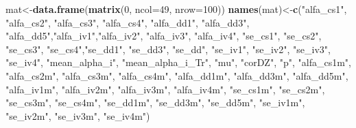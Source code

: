 \documentclass[]{article}
\newenvironment{Shaded}{\begin{snugshade}}{\end{snugshade}}
\newcommand{\KeywordTok}[1]{\textcolor[rgb]{0.13,0.29,0.53}{\textbf{{#1}}}}
\newcommand{\DataTypeTok}[1]{\textcolor[rgb]{0.13,0.29,0.53}{{#1}}}
\newcommand{\DecValTok}[1]{\textcolor[rgb]{0.00,0.00,0.81}{{#1}}}
\newcommand{\StringTok}[1]{\textcolor[rgb]{0.31,0.60,0.02}{{#1}}}
\newcommand{\NormalTok}[1]{{#1}}
\begin{document}
\begin{Shaded}
\begin{Highlighting}[]
\NormalTok{mat<-}\KeywordTok{data.frame}\NormalTok{(}\KeywordTok{matrix}\NormalTok{(}\DecValTok{0}\NormalTok{, }\DataTypeTok{ncol=}\DecValTok{49}\NormalTok{, }\DataTypeTok{nrow=}\DecValTok{100}\NormalTok{))}
\KeywordTok{names}\NormalTok{(mat)<-}\KeywordTok{c}\NormalTok{(}\StringTok{"alfa_cs1"}\NormalTok{, }\StringTok{"alfa_cs2"}\NormalTok{, }\StringTok{"alfa_cs3"}\NormalTok{, }\StringTok{"alfa_cs4"}\NormalTok{, }\StringTok{"alfa_dd1"}\NormalTok{,}
               \StringTok{"alfa_dd3"}\NormalTok{, }\StringTok{"alfa_dd5"}\NormalTok{,}\StringTok{"alfa_iv1"}\NormalTok{,}\StringTok{"alfa_iv2"}\NormalTok{, }\StringTok{"alfa_iv3"}\NormalTok{, }
               \StringTok{"alfa_iv4"}\NormalTok{, }\StringTok{"se_cs1"}\NormalTok{, }\StringTok{"se_cs2"}\NormalTok{, }\StringTok{"se_cs3"}\NormalTok{, }\StringTok{"se_cs4"}\NormalTok{,}\StringTok{"se_dd1"}\NormalTok{,}
               \StringTok{"se_dd3"}\NormalTok{, }\StringTok{"se_dd"}\NormalTok{, }\StringTok{"se_iv1"}\NormalTok{, }\StringTok{"se_iv2"}\NormalTok{, }\StringTok{"se_iv3"}\NormalTok{, }\StringTok{"se_iv4"}\NormalTok{,}
               \StringTok{"mean_alpha_i"}\NormalTok{, }\StringTok{"mean_alpha_i_Tr"}\NormalTok{, }\StringTok{"mu"}\NormalTok{, }\StringTok{"corDZ"}\NormalTok{, }\StringTok{"p"}\NormalTok{,}
               \StringTok{"alfa_cs1m"}\NormalTok{, }\StringTok{"alfa_cs2m"}\NormalTok{, }\StringTok{"alfa_cs3m"}\NormalTok{, }\StringTok{"alfa_cs4m"}\NormalTok{, }\StringTok{"alfa_dd1m"}\NormalTok{,}
               \StringTok{"alfa_dd3m"}\NormalTok{, }\StringTok{"alfa_dd5m"}\NormalTok{, }\StringTok{"alfa_iv1m"}\NormalTok{, }\StringTok{"alfa_iv2m"}\NormalTok{, }\StringTok{"alfa_iv3m"}\NormalTok{,}
               \StringTok{"alfa_iv4m"}\NormalTok{, }\StringTok{"se_cs1m"}\NormalTok{, }\StringTok{"se_cs2m"}\NormalTok{, }\StringTok{"se_cs3m"}\NormalTok{, }\StringTok{"se_cs4m"}\NormalTok{, }\StringTok{"se_dd1m"}\NormalTok{,}
               \StringTok{"se_dd3m"}\NormalTok{, }\StringTok{"se_dd5m"}\NormalTok{, }\StringTok{"se_iv1m"}\NormalTok{, }\StringTok{"se_iv2m"}\NormalTok{, }\StringTok{"se_iv3m"}\NormalTok{, }\StringTok{"se_iv4m"}\NormalTok{)}


\end{Highlighting}
\end{Shaded}
\end{document}
